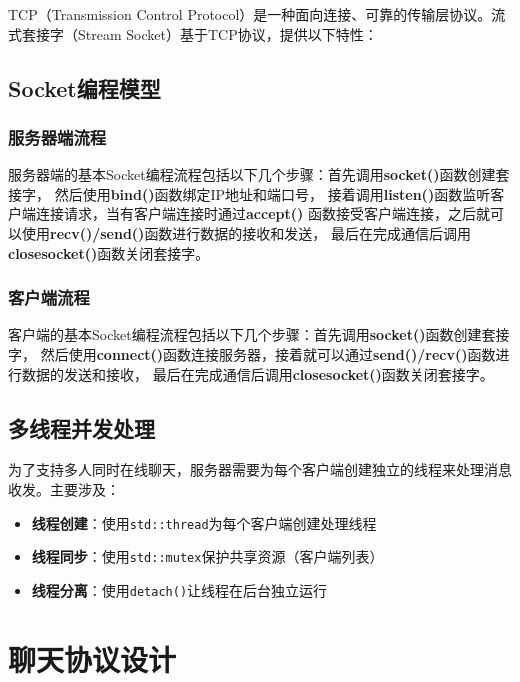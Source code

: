 \documentclass[12pt, a4paper]{article}
\newcommand{\cmd}[1]{\texttt{#1}}
\begin{document}
TCP（Transmission Control Protocol）是一种面向连接、可靠的传输层协议。流式套接字（Stream Socket）基于TCP协议，提供以下特性：

\subsection{Socket编程模型}



\subsubsection{服务器端流程}

服务器端的基本Socket编程流程包括以下几个步骤：首先调用\textbf{socket()}函数创建套接字，
然后使用\textbf{bind()}函数绑定IP地址和端口号，
接着调用\textbf{listen()}函数监听客户端连接请求，当有客户端连接时通过\textbf{accept()}
函数接受客户端连接，之后就可以使用\textbf{recv()/send()}函数进行数据的接收和发送，
最后在完成通信后调用\textbf{closesocket()}函数关闭套接字。

\subsubsection{客户端流程}

客户端的基本Socket编程流程包括以下几个步骤：首先调用\textbf{socket()}函数创建套接字，
然后使用\textbf{connect()}函数连接服务器，接着就可以通过\textbf{send()/recv()}函数进行数据的发送和接收，
最后在完成通信后调用\textbf{closesocket()}函数关闭套接字。

\subsection{多线程并发处理}

为了支持多人同时在线聊天，服务器需要为每个客户端创建独立的线程来处理消息收发。主要涉及：

\begin{itemize}[itemsep=3pt]
  \item \textbf{线程创建}：使用\cmd{std::thread}为每个客户端创建处理线程
  \item \textbf{线程同步}：使用\cmd{std::mutex}保护共享资源（客户端列表）
  \item \textbf{线程分离}：使用\cmd{detach()}让线程在后台独立运行
\end{itemize}

\section{聊天协议设计}
\end{document}
